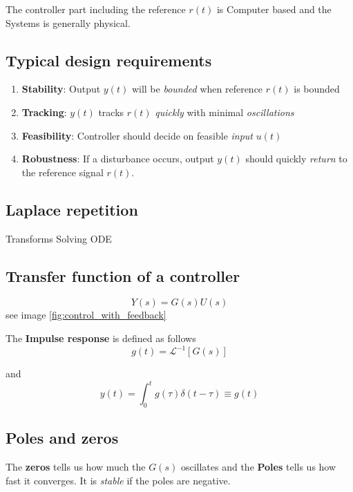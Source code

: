 \documentclass{article}
\begin{document}
The controller part including the reference $r(t)$ is Computer based and the Systems
is generally physical.

\subsection{Typical design requirements}
\begin{enumerate}
    \item \textbf{Stability}: Output $y(t)$ will be \textit{bounded} when reference $r(t)$ is bounded
    \item \textbf{Tracking}: $y(t)$ tracks $r(t)$ \textit{quickly} with minimal \textit{oscillations}
    \item \textbf{Feasibility}: Controller should decide on feasible \textit{input} $u(t)$
    \item \textbf{Robustness}: If a disturbance occurs, output $y(t)$ should quickly \textit{return} to the reference signal $r(t)$.
\end{enumerate}

\subsection{Laplace repetition}
Transforms
Solving ODE 

\subsection{Transfer function of a controller}
\begin{equation*}
    Y(s) = G(s) U(s)
\end{equation*}
see image \ref{fig:control_with_feedback}

The \textbf{Impulse response} is defined as follows
\begin{equation*}
    g(t) = \mathcal{L}^{-1}[G(s)]
\end{equation*}

and
\begin{equation*}
    y(t) = \int_0^t g(\tau) \delta(t-\tau) \equiv g(t)
\end{equation*}

\subsection{Poles and zeros}
The \textbf{zeros} tells us how much the $G(s)$ oscillates and the \textbf{Poles} tells
us how fast it converges. It is \textit{stable} if the poles are negative.
\end{document}
